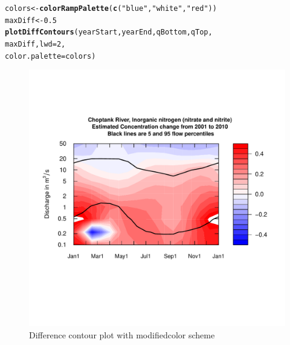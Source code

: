 \documentclass[a4paper,11pt]{article}\usepackage[]{graphicx}\usepackage[]{color}
\makeatletter
\newcommand{\hlnum}[1]{\textcolor[rgb]{0.686,0.059,0.569}{#1}}%
\newcommand{\hlstr}[1]{\textcolor[rgb]{0.192,0.494,0.8}{#1}}%
\newcommand{\hlstd}[1]{\textcolor[rgb]{0.345,0.345,0.345}{#1}}%
\newcommand{\hlkwb}[1]{\textcolor[rgb]{0.69,0.353,0.396}{#1}}%
\newcommand{\hlkwc}[1]{\textcolor[rgb]{0.333,0.667,0.333}{#1}}%
\newcommand{\hlkwd}[1]{\textcolor[rgb]{0.737,0.353,0.396}{\textbf{#1}}}%
\newenvironment{kframe}{%
 \def\at@end@of@kframe{}%
 \ifinner\ifhmode%
  \def\at@end@of@kframe{\end{minipage}}%
  \begin{minipage}{\columnwidth}%
 \fi\fi%
 \def\FrameCommand##1{\hskip\@totalleftmargin \hskip-\fboxsep
 \colorbox{shadecolor}{##1}\hskip-\fboxsep
     \hskip-\linewidth \hskip-\@totalleftmargin \hskip\columnwidth}%
 \MakeFramed {\advance\hsize-\width
   \@totalleftmargin\z@ \linewidth\hsize
   \@setminipage}}%
 {\par\unskip\endMakeFramed%
 \at@end@of@kframe}
\newenvironment{knitrout}{}{} %
\makeatother
\begin{document}
\begin{knitrout}
\color{fgcolor}\begin{kframe}
\begin{alltt}
\hlstd{colors} \hlkwb{<-} \hlkwd{colorRampPalette}\hlstd{(}\hlkwd{c}\hlstd{(}\hlstr{"blue"}\hlstd{,}\hlstr{"white"}\hlstd{,}\hlstr{"red"}\hlstd{))}
\hlstd{maxDiff}\hlkwb{<-}\hlnum{0.5}
\hlkwd{plotDiffContours}\hlstd{(yearStart,yearEnd,qBottom,qTop,}
             \hlstd{maxDiff,}\hlkwc{lwd}\hlstd{=}\hlnum{2}\hlstd{,}
             \hlkwc{color.palette}\hlstd{=colors)}
\end{alltt}
\end{kframe}\begin{figure}[]

\includegraphics[width=1\linewidth,height=1\linewidth]{figure/modifiedDiffContour} \caption[Difference contour plot with modifiedcolor scheme]{Difference contour plot with modifiedcolor scheme\label{fig:modifiedDiffContour}}
\end{figure}


\end{knitrout}



\FloatBarrier



\appendix
\end{document}
